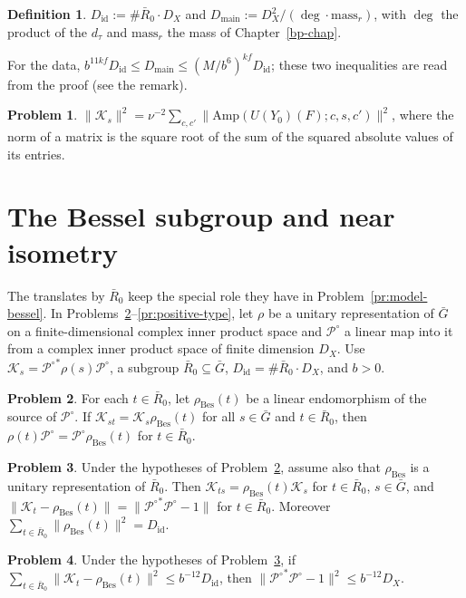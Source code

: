 \documentclass[reqno]{amsart}
\newcounter{chap}
\theoremstyle{definition}
\newtheorem{problem}{Problem}[section]
\newtheorem{definition}{Definition}[section]
\theoremstyle{plain}
\theoremstyle{remark}
\newcommand{\Gb}{\bar G}
\newcommand{\Rb}{\bar R_0}
\newcommand{\Kc}{\mathcal K}
\newcommand{\Po}{{\mathcal P^\circ}}
\newcommand{\rB}{\rho_{\mathrm{Bes}}}
\newcommand{\Amp}{\mathrm{Amp}}
\newcommand{\Did}{D_{\mathrm{id}}}
\newcommand{\Dmain}{D_{\mathrm{main}}}
\begin{document}
\begin{definition}\label{def:two-sizes}
\(\Did:=\#\Rb\cdot D_X\) and \(\Dmain:=D_X^2/(\deg\cdot\mathrm{mass}_r)\), with \(\deg\) the product of the \(d_\tau\) and \(\mathrm{mass}_r\) the mass of Chapter~\ref{bp-chap}.
\end{definition}

For the data, \(b^{11kf}\Did\le\Dmain\le(M/b^6)^{kf}\Did\); these two inequalities are read from the proof (see the remark).

\begin{problem}\label{pr:hs-moment}
\(\lVert\Kc_s\rVert^2=\nu^{-2}\sum_{c,c'}\lVert\Amp(U(Y_0)(F);c,s,c')\rVert^2\), where the norm of a matrix is the square root of the sum of the squared absolute values of its entries.
\end{problem}

\section{The Bessel subgroup and near isometry}\label{sec:bessel}

The translates by \(\Rb\) keep the special role they have in Problem~\ref{pr:model-bessel}.  In Problems~\ref{pr:intertwine}--\ref{pr:positive-type}, let \(\rho\) be a unitary representation of \(\Gb\) on a finite-dimensional complex inner product space and \(\Po\) a linear map into it from a complex inner product space of finite dimension \(D_X\).  Use \(\Kc_s=\Po^*\rho(s)\Po\), a subgroup \(\Rb\subseteq\Gb\), \(\Did=\#\Rb\cdot D_X\), and \(b>0\).

\begin{problem}\label{pr:intertwine}
For each \(t\in\Rb\), let \(\rB(t)\) be a linear endomorphism of the source of \(\Po\).
If \(\Kc_{st}=\Kc_s\rB(t)\) for all \(s\in\Gb\) and \(t\in\Rb\), then \(\rho(t)\Po=\Po\rB(t)\) for \(t\in\Rb\).
\end{problem}

\begin{problem}\label{pr:bessel-translate}
Under the hypotheses of Problem~\ref{pr:intertwine}, assume also that \(\rB\) is a unitary representation of \(\Rb\).  Then \(\Kc_{ts}=\rB(t)\Kc_s\) for \(t\in\Rb\), \(s\in\Gb\), and \(\lVert\Kc_t-\rB(t)\rVert=\lVert\Po^*\Po-1\rVert\) for \(t\in\Rb\).  Moreover \(\sum_{t\in\Rb}\lVert\rB(t)\rVert^2=\Did\).
\end{problem}

\begin{problem}\label{pr:near-one}
Under the hypotheses of Problem~\ref{pr:bessel-translate}, if \(\sum_{t\in\Rb}\lVert\Kc_t-\rB(t)\rVert^2\le b^{-12}\Did\), then \(\lVert\Po^*\Po-1\rVert^2\le b^{-12}D_X\).
\end{problem}
\end{document}
